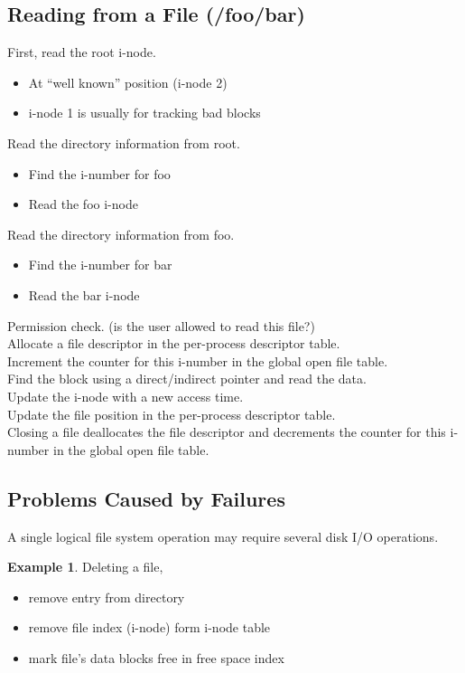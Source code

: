 \documentclass[12pt]{article}
\theoremstyle{plain}
\theoremstyle{definition}
\newtheorem*{ex*}{Example}
\begin{document}
\subsection{Reading from a File (/foo/bar)}
First, read the root i-node.
\begin{itemize}
  \item At ``well known'' position (i-node 2)
  \item i-node 1 is usually for tracking bad blocks
\end{itemize}
Read the directory information from root.
\begin{itemize}
  \item Find the i-number for foo
  \item Read the foo i-node
\end{itemize}
Read the directory information from foo.
\begin{itemize}
  \item Find the i-number for bar
  \item Read the bar i-node
\end{itemize}
Permission check. (is the user allowed to read this file?) \\
Allocate a file descriptor in the per-process descriptor table. \\
Increment the counter for this i-number in the global open file table. \\
Find the block using a direct/indirect pointer and read the data. \\
Update the i-node with a new access time. \\
Update the file position in the per-process descriptor table. \\
Closing a file deallocates the file descriptor and decrements the counter for this i-number in the global open file table.

\subsection{Problems Caused by Failures}
A single logical file system operation may require several disk I/O operations.

\begin{ex*}
Deleting a file,
\begin{itemize}
  \item remove entry from directory
  \item remove file index (i-node) form i-node table
  \item mark file's data blocks free in free space index
\end{itemize}
\end{ex*}
\end{document}
